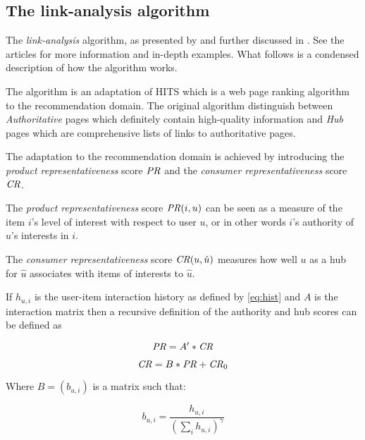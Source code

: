 \subsection{The link-analysis algorithm}\label{sec:background:theory:linkanalysis}



The \textit{link-analysis} algorithm, as presented by \cite{huang2004link} and further discussed in \cite{huang2007comparison}. See the articles for more information and in-depth examples. What follows is a condensed description of how the algorithm works.

The algorithm is an adaptation of HITS \cite{kleinberg1999authoritative} which is a web page ranking algorithm to the recommendation domain. The original algorithm distinguish between \textit{Authoritative} pages which definitely contain high-quality information and \textit{Hub} pages which are comprehensive lists of links to authoritative pages. \citep{huang2007comparison}

The adaptation to the recommendation domain is achieved by introducing the \textit{product representativeness} score $\mathit{PR}$ and the \textit{consumer representativeness} score $\mathit{CR}$.

The \textit{product representativeness} score $\mathit{PR}(i, u)$ can be seen as a measure of the item $i$'s level of interest with respect to user $u$, or in other words $i$'s authority of $u$'s interests in $i$.

The \textit{consumer representativeness} score $\mathit{CR}(u, \hat{u})$ measures how well $u$ as a hub for $\hat{u}$ associates with items of interests to $\hat{u}$.

If $h_{u, i}$ is the user-item interaction history as defined by \ref{eq:hist} and $A$ is the interaction matrix then a recursive definition of the authority and hub scores can be defined as

\begin{equation}
    \mathit{PR} = A' * \mathit{CR}
\end{equation}

\begin{equation}
    \mathit{CR} = B * \mathit{PR} + \mathit{CR}_0
\end{equation}

Where $B = (b_{u, i})$ is a matrix such that:

\begin{equation}
    b_{u, i} = \frac{ h_{u, i} }{ \left(\sum_{i} h_{u, i}\right)^\gamma }
\end{equation}

